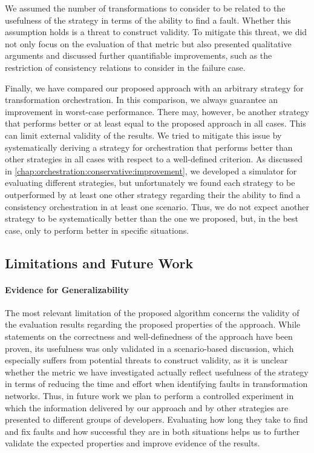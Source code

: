 We assumed the number of transformations to consider to be related to the usefulness of the strategy in terms of the ability to find a fault.
Whether this assumption holds is a threat to construct validity.
To mitigate this threat, we did not only focus on the evaluation of that metric but also presented qualitative arguments and discussed further quantifiable improvements, such as the restriction of consistency relations to consider in the failure case.

Finally, we have compared our proposed approach with an arbitrary strategy for transformation orchestration.
In this comparison, we always guarantee an improvement in worst-case performance.
There may, however, be another strategy that performs better or at least equal to the proposed approach in all cases.
This can limit external validity of the results.
We tried to mitigate this issue by systematically deriving a strategy for orchestration that performs better than other strategies in all cases with respect to a well-defined criterion.
As discussed in \autoref{chap:orchestration:conservative:improvement}, we developed a simulator for evaluating different strategies, but unfortunately we found each strategy to be outperformed by at least one other strategy regarding their the ability to find a consistency orchestration in at least one scenario.
Thus, we do not expect another strategy to be systematically better than the one we proposed, but, in the best case, only to perform better in specific situations.


\subsection{Limitations and Future Work}
\label{chap:correctness_evaluation:orchestration:limitations}

\paragraph{Evidence for Generalizability}
The most relevant limitation of the proposed algorithm concerns the validity of the evaluation results regarding the proposed properties of the approach.
While statements on the correctness and well-definedness of the approach have been proven, its usefulness was only validated in a scenario-based discussion, which especially suffers from potential threats to construct validity, as it is unclear whether the metric we have investigated actually reflect usefulness of the strategy in terms of reducing the time and effort when identifying faults in transformation networks.
Thus, in future work we plan to perform a controlled experiment in which the information delivered by our approach and by other strategies are presented to different groups of developers.
Evaluating how long they take to find and fix faults and how successful they are in both situations helps us to further validate the expected properties and improve evidence of the results.

